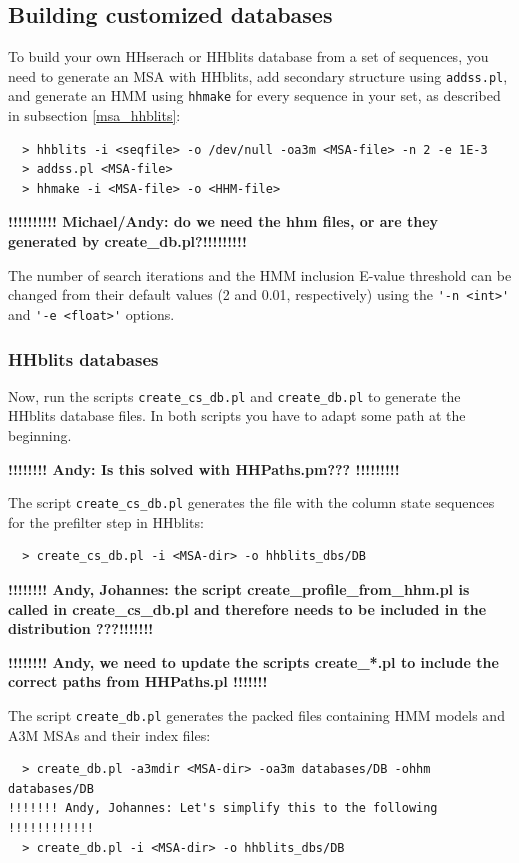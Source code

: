 \documentclass[11pt,a4paper]{article}
\begin{document}
\subsection{Building customized databases}

To build your own HHserach or HHblits database from a set of sequences, you need to 
generate an MSA with HHblits, add secondary structure using \verb`addss.pl`, and generate an HMM 
using \verb`hhmake` for every sequence in your set, as described in subsection \ref{msa_hhblits}:
\begin{verbatim}
  > hhblits -i <seqfile> -o /dev/null -oa3m <MSA-file> -n 2 -e 1E-3
  > addss.pl <MSA-file>
  > hhmake -i <MSA-file> -o <HHM-file>
\end{verbatim}
{\bf !!!!!!!!!! Michael/Andy: do we need the hhm files, or are they generated by create_db.pl?!!!!!!!!!}

The number of search iterations and the HMM inclusion E-value threshold can be changed from their default values (2 and 0.01, respectively) using the \verb`'-n <int>'` and \verb`'-e <float>'` options. 


\subsubsection*{HHblits databases}

Now, run the scripts \verb`create_cs_db.pl` and \verb`create_db.pl` to generate the
HHblits database files. In both scripts you have to adapt some path at the beginning.

{\bf !!!!!!!! Andy: Is this solved with HHPaths.pm??? !!!!!!!!!}

The script \verb`create_cs_db.pl` generates the file with the column state sequences for the prefilter step in HHblits:
\begin{verbatim}
  > create_cs_db.pl -i <MSA-dir> -o hhblits_dbs/DB
\end{verbatim}
{\bf !!!!!!!! Andy, Johannes: the script create\_profile\_from\_hhm.pl is called in create\_cs\_db.pl and therefore needs to be included in the distribution ???!!!!!!!}

{\bf !!!!!!!! Andy, we need to update the scripts create\_*.pl to include the correct paths from HHPaths.pl !!!!!!!}

The script \verb`create_db.pl` generates the packed files containing HMM models and A3M MSAs and their index files:
\begin{verbatim}
  > create_db.pl -a3mdir <MSA-dir> -oa3m databases/DB -ohhm databases/DB
!!!!!!! Andy, Johannes: Let's simplify this to the following !!!!!!!!!!!!
  > create_db.pl -i <MSA-dir> -o hhblits_dbs/DB
\end{verbatim}
\end{document}
